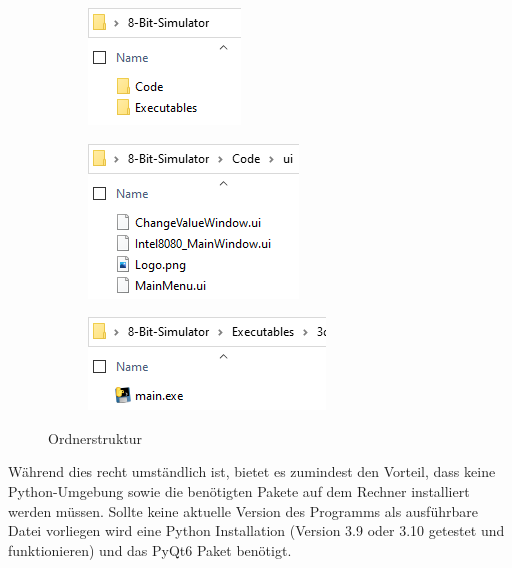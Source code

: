 \documentclass[12pt]{article}
\begin{document}
\begin{figure}[h]
\centering
\begin{subfigure}{.25\textwidth}
  \centering
  \includegraphics[width=.7\linewidth]{bilder/o1}
\end{subfigure}%
\begin{subfigure}{.35\textwidth}
  \centering
  \includegraphics[width=.7\linewidth]{bilder/o2}
\end{subfigure}
\begin{subfigure}{.35\textwidth}
  \centering
  \includegraphics[width=.7\linewidth]{bilder/o3}
\end{subfigure}
\caption{Ordnerstruktur}
\label{fig:OrdnerStruk}
\end{figure}

\noindent
Während dies recht umständlich ist, bietet es zumindest den Vorteil, dass keine Python-Umgebung sowie die benötigten Pakete auf dem Rechner installiert werden müssen. Sollte keine aktuelle Version des Programms als ausführbare Datei vorliegen wird eine Python Installation (Version 3.9 oder 3.10 getestet und funktionieren) und das PyQt6 Paket \cite{qt} benötigt.
\end{document}
